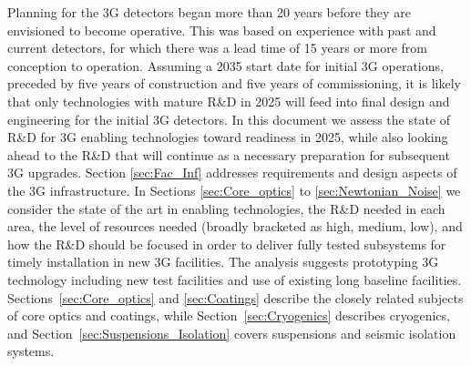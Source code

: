 

Planning for the 3G detectors began more than 20 years before they are envisioned to become operative. 
This was based on experience with past and current detectors, for which there was a lead time of 15 years or more from conception to operation. 
Assuming a 2035 start date for initial 3G operations, preceded by five years of construction and five years of commissioning, it is likely that only technologies with mature R\&D in 2025 will feed into final design and engineering for the initial 3G detectors. In this document we assess the state of R\&D for 3G enabling technologies toward readiness in 2025, while also looking ahead to the R\&D that will continue as a necessary preparation for subsequent 3G upgrades. 
Section \ref{sec:Fac_Inf} addresses requirements and design aspects of the 3G infrastructure.
In Sections \ref{sec:Core_optics} to \ref{sec:Newtonian_Noise} we consider the state of the art in enabling technologies, the R\&D needed in each area, the level of resources needed (broadly bracketed as high, medium, low), and how the R\&D should be focused in order to deliver fully tested subsystems for timely installation in new 3G facilities. 
The analysis suggests prototyping 3G technology including new test facilities and use of existing long baseline facilities. 
Sections~\ref{sec:Core_optics} and \ref{sec:Coatings} describe the closely related subjects of core optics and coatings, while Section~\ref{sec:Cryogenics} describes cryogenics, and Section~\ref{sec:Suspensions_Isolation} covers suspensions and seismic isolation systems.

